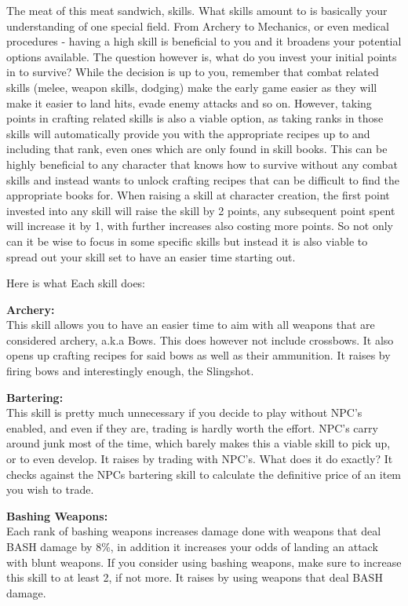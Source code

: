 The meat of this meat sandwich, skills. What skills amount to is basically your understanding of one special field. From Archery to Mechanics, or even medical procedures - having a high skill is beneficial to you and it broadens your potential options available. The question however is, what do you invest your initial points in to survive? While the decision is up to you, remember that combat related skills (melee, weapon skills, dodging) make the early game easier as they will make it easier to land hits, evade enemy attacks and so on. However, taking points in crafting related skills is also a viable option, as taking ranks in those skills will automatically provide you with the appropriate recipes up to and including that rank, even ones which are only found in skill books. This can be highly beneficial to any character that knows how to survive without any combat skills and instead wants to unlock crafting recipes that can be difficult to find the appropriate books for. When raising a skill at character creation, the first point invested into any skill will raise the skill by 2 points, any subsequent point spent will increase it by 1, with further increases also costing more points. So not only can it be wise to focus in some specific skills but instead it is also viable to spread out your skill set to have an easier time starting out.

Here is what Each skill does:

\textbf{Archery:}\\This skill allows you to have an easier time to aim with all weapons that are considered archery, a.k.a Bows. This does however not include crossbows. It also opens up crafting recipes for said bows as well as their ammunition. It raises by firing bows and interestingly enough, the Slingshot.

\textbf{Bartering:}\\This skill is pretty much unnecessary if you decide to play without NPC's enabled, and even if they are, trading is hardly worth the effort. NPC's carry around junk most of the time, which barely makes this a viable skill to pick up, or to even develop. It raises by trading with NPC's. What does it do exactly? It checks against the NPCs bartering skill to calculate the definitive price of an item you wish to trade.

\textbf{Bashing Weapons:}\\Each rank of bashing weapons increases damage done with weapons that deal BASH damage by 8\%, in addition it increases your odds of landing an attack with blunt weapons. If you consider using bashing weapons, make sure to increase this skill to at least 2, if not more. It raises by using weapons that deal BASH damage.

